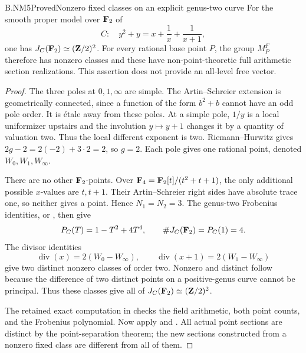 \begin{claim}{B.NM5}{Proved}{Nonzero fixed classes on an explicit genus-two curve}
For the smooth proper model over $\mathbf F_2$ of
\[
                     C:\quad y^2+y=x+\frac1x+\frac1{x+1},
\]
one has $J_C(\mathbf F_2)\simeq(\mathbf Z/2)^2$. For every rational base point
$P$, the group $M_P^F$ therefore has nonzero classes and these
have non-point-theoretic full arithmetic section realizations.
This assertion does not provide an all-level free vector.
\end{claim}
\begin{proof}
The three poles at $0,1,\infty$ are simple. The Artin--Schreier
extension is geometrically connected, since a function of the form
$b^2+b$ cannot have an odd pole order. It is étale away from these
poles. At a simple pole, $1/y$ is a local uniformizer upstairs and
the involution $y\mapsto y+1$ changes it by a quantity of valuation
two. Thus the local different exponent is two. Riemann--Hurwitz
gives $2g-2=2(-2)+3\cdot2=2$, so $g=2$. Each pole gives one
rational point, denoted $W_0,W_1,W_\infty$.

There are no other $\mathbf F_2$-points. Over
$\mathbf F_4=\mathbf F_2[t]/(t^2+t+1)$, the only additional possible
$x$-values are $t,t+1$. Their Artin--Schreier right sides have
absolute trace one, so neither gives a point. Hence $N_1=N_2=3$.
The genus-two Frobenius identities, or
\cite[Theorem 11.1 and Corollary 11.4]{MilneJac}, then give
\[
              P_C(T)=1-T^2+4T^4,\qquad \#J_C(\mathbf F_2)=P_C(1)=4.
\]
The divisor identities
\[
 \operatorname{div}(x)=2(W_0-W_\infty),\qquad
 \operatorname{div}(x+1)=2(W_1-W_\infty)
\]
give two distinct nonzero classes of order two. Nonzero and
distinct follow because the difference of two distinct points on
a positive-genus curve cannot be principal. Thus these classes
give all of $J_C(\mathbf F_2)\simeq(\mathbf Z/2)^2$.

The retained exact computation in
 checks the field arithmetic,
both point counts, and the Frobenius polynomial. Now apply
 and . All actual point
sections are distinct by the point-separation theorem; the new
sections constructed from a nonzero fixed class are different
from all of them.
\end{proof}

